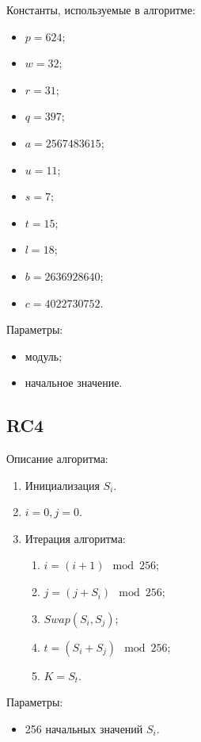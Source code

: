 \documentclass[bachelor, och, pract_otchet]{SCWorks}
\begin{document}
Константы, используемые в алгоритме:
\begin{itemize}
  \item $p = 624$;
  \item $w = 32$;
  \item $r = 31$;
  \item $q = 397$;
  \item $a = 2567483615$;
  \item $u = 11$;
  \item $s = 7$;
  \item $t = 15$;
  \item $l = 18$;
  \item $b = 2636928640$;
  \item $c = 4022730752$.
\end{itemize}

Параметры:
\begin{itemize}
  \item модуль;
  \item начальное значение.
\end{itemize}

\subsection{RC4}
Описание алгоритма:
\begin{enumerate}
  \item Инициализация $S_i$.
  \item $i = 0, j = 0$.
  \item Итерация алгоритма:
    \begin{enumerate}
      \item $i = (i + 1) \mod 256$;
      \item $j = (j + S_i) \mod 256$;
      \item $Swap(S_i, S_j)$;
      \item $t = (S_i + S_j) \mod 256$;
      \item $K = S_t$.
    \end{enumerate}
\end{enumerate}

Параметры:
\begin{itemize}
  \item 256 начальных значений $S_i$.
\end{itemize}
\end{document}
